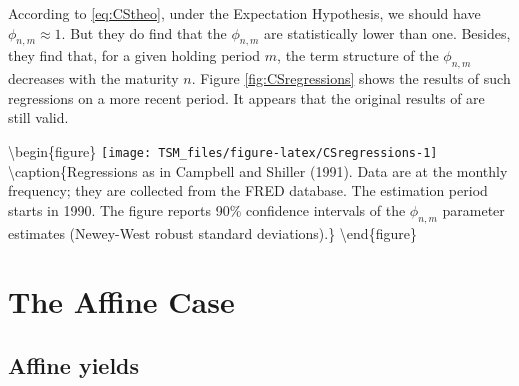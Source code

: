 \documentclass[
  12pt,
]{book}
\theoremstyle{definition}
\theoremstyle{definition}
\theoremstyle{definition}
\theoremstyle{definition}
\theoremstyle{remark}
\begin{document}
According to \eqref{eq:CStheo}, under the Expectation Hypothesis, we should have \(\phi_{n,m} \approx 1\). But they do find that the \(\phi_{n,m}\) are statistically lower than one. Besides, they find that, for a given holding period \(m\), the term structure of the \(\phi_{n,m}\) decreases with the maturity \(n\). Figure \ref{fig:CSregressions} shows the results of such regressions on a more recent period. It appears that the original results of \citet{Campbell_Shiller_1991} are still valid.

\textbackslash begin\{figure\}
\texttt{[image: TSM\_files/figure-latex/CSregressions-1]} \textbackslash caption\{Regressions as in Campbell and Shiller (1991). Data are at the monthly frequency; they are collected from the FRED database. The estimation period starts in 1990. The figure reports 90\% confidence intervals of the \(\phi_{n,m}\) parameter estimates (Newey-West robust standard deviations).\}\label{fig:CSregressions}
\textbackslash end\{figure\}

\hypertarget{RiskFreeAffine}{%
\section{The Affine Case}\label{RiskFreeAffine}}

\hypertarget{AffineYields}{%
\subsection{Affine yields}\label{AffineYields}}
\end{document}
